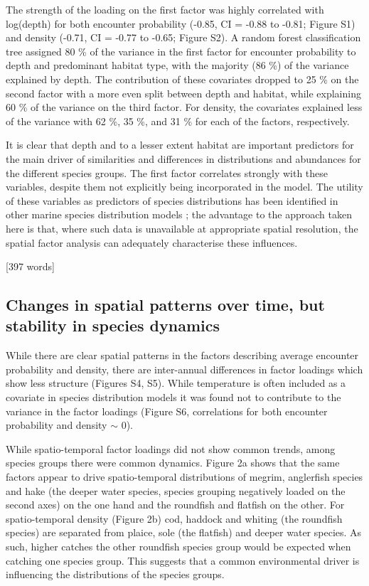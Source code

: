 \documentclass{nature}
\begin{document}
\begin{linenumbers}
The strength of the loading on the first factor was highly correlated with
log(depth) for both encounter probability (-0.85, CI = -0.88 to -0.81; Figure
S1) and density (-0.71, CI = -0.77 to -0.65; Figure S2). A random forest
classification tree assigned 80 \% of the variance in the first factor for
encounter probability to depth and predominant habitat type, with the majority
(86 \%) of the variance explained by depth. The contribution of these
covariates dropped to 25 \% on the second factor with a more even split between
depth and habitat, while explaining 60 \% of the variance on the third factor.
For density, the covariates explained less of the variance with 62 \%, 35 \%,
and 31 \% for each of the factors, respectively.

It is clear that depth and to a lesser extent habitat are important predictors
for the main driver of similarities and differences in distributions and
abundances for the different species groups. The first factor correlates
strongly with these variables, despite them not explicitly being incorporated
in the model. The utility of these variables as predictors of species
distributions has been identified in other marine species distribution models
\cite{Robinson2011}; the advantage to the approach taken here is that, where such
data is unavailable at appropriate spatial resolution, the spatial factor
analysis can adequately characterise these influences.

[397 words]

\subsection{Changes in spatial patterns over time, but stability in species
	dynamics}

While there are clear spatial patterns in the factors describing average
encounter probability and density, there are inter-annual differences in factor
loadings which show less structure (Figures S4, S5). While temperature is often
included as a covariate in species distribution models it was found not to
contribute to the variance in the factor loadings (Figure S6, correlations for
both encounter probability and density $\sim$ 0).

While spatio-temporal factor loadings did not show common trends, among species
groups there were common dynamics. Figure 2a shows that the same factors appear
to drive spatio-temporal distributions of megrim, anglerfish species and hake
(the deeper water species, species grouping negatively loaded on the second
axes) on the one hand and the roundfish and flatfish on the other. For
spatio-temporal density (Figure 2b) cod, haddock and whiting (the roundfish
species) are separated from plaice, sole (the flatfish) and deeper water
species. As such, higher catches the other roundfish species group would be
expected when catching one species group. This suggests that a common
environmental driver is influencing the distributions of the species groups.  


\end{linenumbers}
\end{document}

